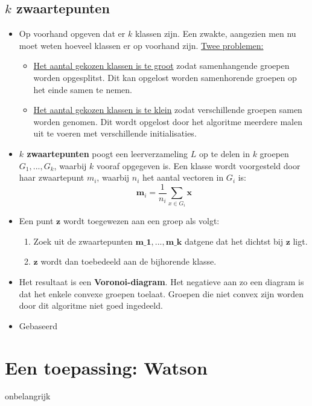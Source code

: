 \subsection{$k$ zwaartepunten}
\begin{itemize}
	\item Op voorhand opgeven dat er $k$ klassen zijn.
	\alert Een zwakte, aangezien men nu moet weten hoeveel klassen er op voorhand zijn. \underline{Twee problemen:}
	\begin{itemize}
		\item \underline{Het aantal gekozen klassen is te groot} zodat samenhangende groepen worden opgesplitst. Dit kan opgelost worden samenhorende groepen op het einde samen te nemen.
		\item \underline{Het aantal gekozen klassen is te klein} zodat verschillende groepen samen worden genomen. Dit wordt opgelost door het algoritme meerdere malen uit te voeren met verschillende initialisaties. 
	\end{itemize}
	\item \textbf{$k$ zwaartepunten} poogt een leerverzameling $L$ op te delen in $k$ groepen $G_1, ..., G_k$, waarbij $k$ vooraf opgegeven is. Een klasse wordt voorgesteld door haar zwaartepunt $m_i$, waarbij $n_i$ het aantal vectoren in $G_i$ is:
	$$\textbf{m}_i = \frac{1}{n_i}\sum_{x \in G_i} \textbf{x}$$
	\item Een punt $\textbf{z}$ wordt toegewezen aan een groep als volgt:
	\begin{enumerate}
		\item Zoek uit de zwaartepunten $\textbf{m_1}, ..., \textbf{m_k}$ datgene dat het dichtst bij $\textbf{z}$ ligt.
		\item $\textbf{z}$ wordt dan toebedeeld aan de bijhorende klasse.
	\end{enumerate}
	\item Het resultaat is een \textbf{Voronoi-diagram}. Het negatieve aan zo een diagram is dat het enkele convexe groepen toelaat.
	\alert Groepen die niet convex zijn worden door dit algoritme niet goed ingedeeld.
	\item Gebaseerd 
	
\end{itemize}
\section{Een toepassing: Watson}
onbelangrijk